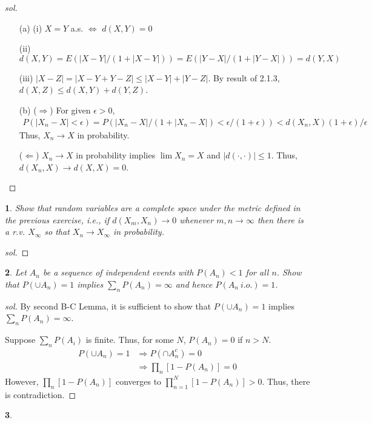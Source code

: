 \documentclass{report}
\newtheorem{ex}{}[section]
\begin{document}
\begin{proof}[sol]~
\begin{enumerate}
\item[(a)] 
(i) $X = Y$ a.s. $\Leftrightarrow$ $d(X,Y) = 0$

(ii) $d(X,Y) = E(|X-Y|/(1+|X-Y|)) =  E(|Y-X|/(1+|Y-X|)) = d(Y,X)$

(iii) $|X-Z| = |X -Y + Y -Z| \le |X-Y| + |Y -Z|$. By result of 2.1.3, $d(X,Z) \le d(X,Y) + d(Y,Z)$.

\item[(b)]
($\Rightarrow$)
For given $\epsilon > 0$,
\begin{align*}
P(|X_n - X| < \epsilon) = P(|X_n-X|/(1+|X_n-X|) < \epsilon/(1+\epsilon)) < d(X_n,X) (1+\epsilon)/\epsilon
\end{align*}
Thus, $X_n \to X$ in probability.

($\Leftarrow$)
$X_n \to X$ in probability implies $\lim X_n = X$ and $|d(\cdot, \cdot)| \le 1 $. Thus, $d(X_n,X) \to d(X,X) = 0$.
\end{enumerate}
\end{proof}
\begin{ex}
Show that random variables are a complete space under the metric defined in the previous exercise, i.e., if $d(X_m, X_n) \to 0$ whenever $m,n \to \infty$ then there is a r.v. $X_\infty$ so that $X_n \to X_\infty$ in probability.
\end{ex}
\begin{proof}[sol]
\end{proof}
\begin{ex}
Let $A_n$ be a sequence of independent events with $P(A_n) < 1$ for all $n$. Show that $P(\cup A_n) = 1$ implies $\sum_n P(A_n) = \infty$ and hence $P(A_n \ i.o.) = 1$.
\end{ex}
\begin{proof}[sol]
By second B-C Lemma, it is sufficient to show that $P(\cup A_n) = 1$ implies $\sum_n P(A_n) = \infty$.

Suppose $\sum_n P(A_i)$ is finite. Thus, for some $N$, $P(A_n) = 0$ if $n > N$.
\begin{align*}
P(\cup A_n) = 1 &\Rightarrow P(\cap A_n^c) = 0\\
&\Rightarrow \prod_n [1 - P(A_n)] = 0
\end{align*}
However, $\prod_n [1 - P(A_n)] $ converges to $\prod^N_{n=1} [1 - P(A_n)] > 0$. Thus, there is contradiction.
\end{proof}
\begin{ex}
\end{ex}
\end{document}
